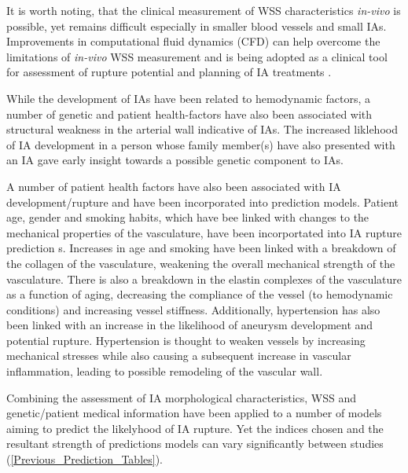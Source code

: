 It is worth noting, that the clinical measurement of WSS characteristics \textit{in-vivo} is possible, yet remains difficult especially in smaller blood vessels and small IAs. Improvements in computational fluid dynamics (CFD) can help overcome the limitations of \textit{in-vivo} WSS measurement and is being adopted as a clinical tool for assessment of rupture potential and planning of IA treatments \cite{steinman2002image,valen2013mind}. 

While the development of IAs have been related to hemodynamic factors, a number of genetic and patient health-factors have also been associated with structural weakness in the arterial wall indicative of IAs\cite{mohan2015genetic,theodotou2017genetic}. The increased liklehood of IA development in a person whose family member(s) have also presented with an IA gave early insight towards a possible genetic component to IAs. 

A number of patient health factors have also been associated with IA development/rupture and have been incorporated into prediction models. Patient age, gender and smoking habits, which have bee linked with changes to the mechanical properties of the vasculature, have been incorportated into IA rupture prediction \cite{McDowell2018,Backes2016,brinjikji2015risk}s. Increases in age and smoking\cite{mcdowell2018demographic,Backes951,Korja2014,greving2014development} have been linked with a breakdown of the collagen of the vasculature, weakening the overall mechanical strength of the vasculature. There is also a breakdown in the elastin complexes of the vasculature as a function of aging, decreasing the compliance of the vessel (to hemodynamic conditions) and increasing vessel stiffness\cite{duca2016matrix,wang2018proinflammatory}. Additionally, hypertension has also been linked with an increase in the likelihood of aneurysm development and potential rupture\cite{sun2019effects,qian2016assessment}. Hypertension is thought to weaken vessels by increasing mechanical stresses while also causing a subsequent increase in vascular inflammation, leading to possible remodeling of the vascular wall\cite{schiffrin2018novel}.

Combining the assessment of IA morphological characteristics, WSS and genetic/patient medical information have been applied to a number of models aiming to predict the likelyhood of IA rupture. Yet the indices chosen and the resultant strength of predictions models can vary significantly between studies (\ref{Previous_Prediction_Tables}). 

